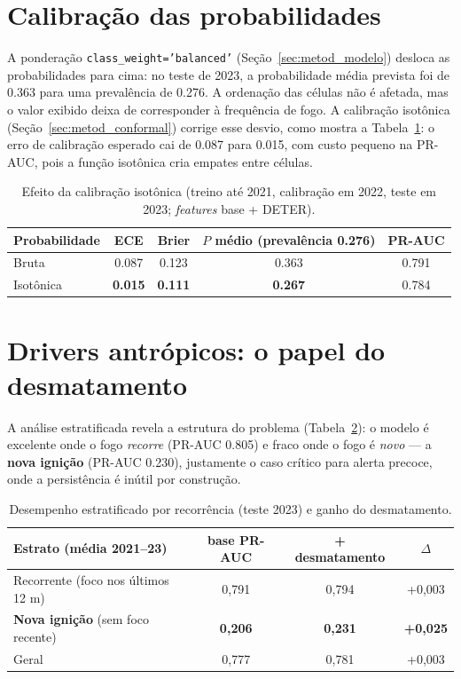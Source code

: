 \section{Calibração das probabilidades}
\label{sec:oco_calibracao}

A ponderação \texttt{class\_weight='balanced'} (Seção~\ref{sec:metod_modelo}) desloca as probabilidades para cima: no teste de 2023, a probabilidade média prevista foi de \num{0,363} para uma prevalência de \num{0,276}. A ordenação das células não é afetada, mas o valor exibido deixa de corresponder à frequência de fogo. A calibração isotônica (Seção~\ref{sec:metod_conformal}) corrige esse desvio, como mostra a Tabela~\ref{tab:oco_calibracao}: o erro de calibração esperado cai de \num{0,087} para \num{0,015}, com custo pequeno na PR-AUC, pois a função isotônica cria empates entre células.

\begin{table}[h]
\centering
\caption{Efeito da calibração isotônica (treino até 2021, calibração em 2022, teste em 2023; \emph{features} base + DETER).}
\label{tab:oco_calibracao}
\small
\begin{tabular}{lcccc}
\toprule
\textbf{Probabilidade} & \textbf{ECE} & \textbf{Brier} & \textbf{\(P\) médio (prevalência \num{0,276})} & \textbf{PR-AUC} \\
\midrule
Bruta      & \num{0,087} & \num{0,123} & \num{0,363} & \num{0,791} \\
Isotônica  & \textbf{\num{0,015}} & \textbf{\num{0,111}} & \textbf{\num{0,267}} & \num{0,784} \\
\bottomrule
\end{tabular}
\end{table}

\section{Drivers antrópicos: o papel do desmatamento}
\label{sec:oco_drivers}

A análise estratificada revela a estrutura do problema (Tabela~\ref{tab:oco_estrato}): o
modelo é excelente onde o fogo \emph{recorre} (PR-AUC \num{0,805}) e fraco onde o fogo é
\emph{novo} --- a \textbf{nova ignição} (PR-AUC \num{0,230}), justamente o caso crítico para
alerta precoce, onde a persistência é inútil por construção.

\begin{table}[h]
\centering
\caption{Desempenho estratificado por recorrência (teste 2023) e ganho do desmatamento.}
\label{tab:oco_estrato}
\small
\begin{tabular}{lccc}
\toprule
\textbf{Estrato (média 2021--23)} & \textbf{base PR-AUC} & \textbf{+ desmatamento} & \textbf{\(\Delta\)} \\
\midrule
Recorrente (foco nos últimos 12 m) & 0,791 & 0,794 & +0,003 \\
\textbf{Nova ignição} (sem foco recente) & \textbf{0,206} & \textbf{0,231} & \textbf{+0,025} \\
Geral & 0,777 & 0,781 & +0,003 \\
\bottomrule
\end{tabular}
\end{table}

